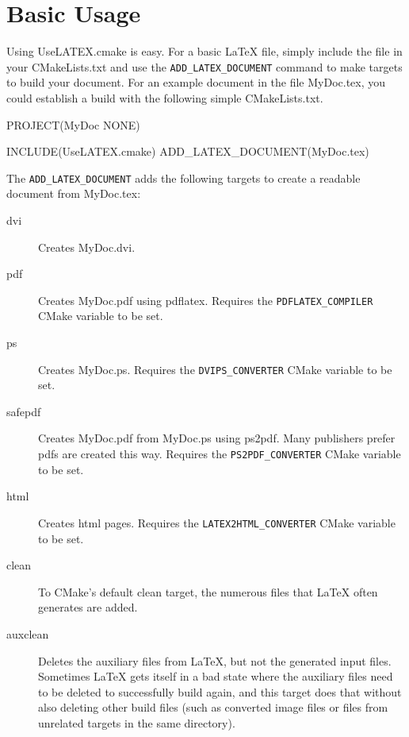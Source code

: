 \documentclass{article}
\newcommand*{\textfile}[1]{\textsf{#1}}
\newcommand*{\textprog}[1]{\textfile{#1}}
\newcommand*{\textcmake}[1]{\texttt{#1}}
\newcommand*{\textcmakevar}[1]{\textcmake{#1}}
\newcommand*{\textmaketarget}[1]{#1}
\newcommand*{\UseLATEX}{\textfile{UseLATEX.cmake}\xspace}
\newcommand*{\latex}{\LaTeX\xspace}
\newcommand*{\ald}{\textcmake{ADD\_LATEX\_DOCUMENT}\xspace}
\begin{document}

  \section{Basic Usage}
  \label{sec:BasicUsage}

  Using \UseLATEX is easy. For a basic \latex file, simply include the file
  in your \textfile{CMakeLists.txt} and use the \ald command to make
  targets to build your document. For an example document in the file
  \textfile{MyDoc.tex}, you could establish a build with the following
  simple \textfile{CMakeLists.txt}.

  \begin{CodeListing}
PROJECT(MyDoc NONE)

INCLUDE(UseLATEX.cmake)
ADD_LATEX_DOCUMENT(MyDoc.tex)
  \end{CodeListing}

  The \ald adds the following targets to create a readable document from
  \textfile{MyDoc.tex}:

  \begin{description}
    \item[\textmaketarget{dvi}] Creates \textfile{MyDoc.dvi}. 
    \item[\textmaketarget{pdf}] Creates \textfile{MyDoc.pdf} using
      \textprog{pdflatex}. Requires the \textcmakevar{PDFLATEX\_COMPILER}
      CMake variable to be set.
    \item[\textmaketarget{ps}] Creates \textfile{MyDoc.ps}. Requires the
      \textcmakevar{DVIPS\_CONVERTER} CMake variable to be set.
    \item[\textmaketarget{safepdf}] Creates \textfile{MyDoc.pdf} from
      \textfile{MyDoc.ps} using \textprog{ps2pdf}. Many publishers prefer
      pdfs are created this way. Requires the
      \textcmakevar{PS2PDF\_CONVERTER} CMake variable to be set.
    \item[\textmaketarget{html}] Creates html pages. Requires the
      \textcmakevar{LATEX2HTML\_CONVERTER} CMake variable to be set.
    \item[\textmaketarget{clean}] To CMake's default \textmaketarget{clean}
      target, the numerous files that \latex often generates are added.
    \item[\textmaketarget{auxclean}] Deletes the auxiliary files from
      \latex, but not the generated input files.  Sometimes \latex gets
      itself in a bad state where the auxiliary files need to be deleted to
      successfully build again, and this target does that without also
      deleting other build files (such as converted image files or files
      from unrelated targets in the same directory).
  \end{description}
\end{document}
